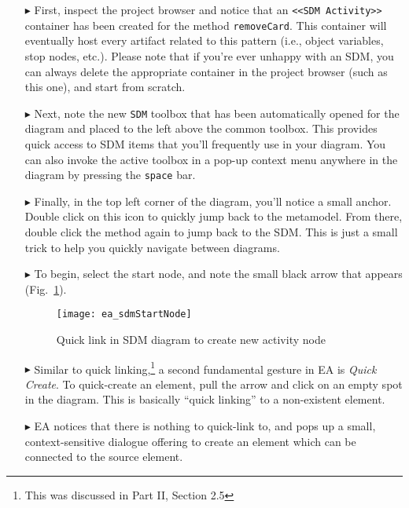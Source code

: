 \begin{itemize}
\item[$\blacktriangleright$] First, inspect the project browser and notice that an \texttt{<<SDM Activity>>} container has been created for the method
\texttt{removeCard}. This container will eventually host every artifact related to this pattern (i.e., object variables, stop nodes, etc.). Please note
that if you're ever unhappy with an SDM, you can always delete the appropriate container in the project browser (such as this one), and start from scratch.

\item[$\blacktriangleright$] Next, note the new \texttt{SDM} toolbox that has been automatically opened for the diagram and placed to the left above
the common toolbox. This provides quick access to SDM items that you'll frequently use in your diagram. You can also invoke the active toolbox in a pop-up
context menu anywhere in the diagram by pressing the \texttt{space} bar.

\item[$\blacktriangleright$] Finally, in the top left corner of the diagram, you'll notice a small anchor. Double click on this icon to quickly jump back to the
metamodel. From there, double click the method again to jump back to the SDM. This is just a small trick to help you quickly navigate between diagrams.

\newpage

\item[$\blacktriangleright$] To begin, select the start node, and note the small black arrow that appears (Fig.~\ref{fig:sdm_quicklink}). 

\begin{figure}[htp]
\begin{center}
  \texttt{[image: ea\_sdmStartNode]}
  \caption{Quick link in SDM diagram to create new activity node}  
  \label{fig:sdm_quicklink}
\end{center}
\end{figure}

\item[$\blacktriangleright$] Similar to quick linking,\footnote{This was discussed in Part II, Section 2.5} a second fundamental gesture in EA is \emph{Quick
Create}.
To quick-create an element, pull the arrow and click on an empty spot in the diagram. This is basically ``quick linking'' to a non-existent element.

\item[$\blacktriangleright$] EA notices that there is nothing to quick-link to, and pops up a small, context-sensitive dialogue offering to create an element
which can be connected to the source element.


\end{itemize}
